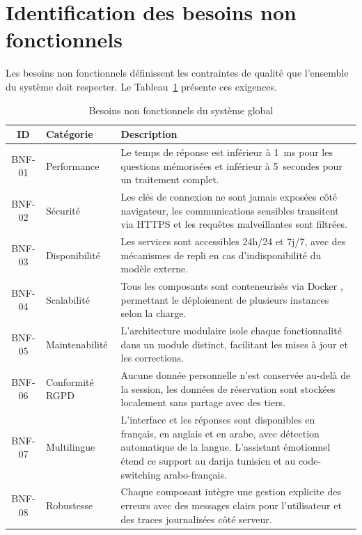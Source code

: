 \section{Identification des besoins non fonctionnels}

Les besoins non fonctionnels définissent les contraintes de qualité que l'ensemble du
système doit respecter. Le Tableau~\ref{tab:besoins_non_fonctionnels} présente ces exigences.

\vspace{6pt}
\begin{table}[H]
\caption{Besoins non fonctionnels du système global}
\label{tab:besoins_non_fonctionnels}
\centering
\small
\setlength{\tabcolsep}{4pt}
\begin{tabular}{|c|p{3cm}|p{9.8cm}|}
\hline
\textbf{ID} & \textbf{Catégorie} & \textbf{Description} \\
\hline
BNF-01 & Performance
        & Le temps de réponse est inférieur à 1~ms pour les questions mémorisées et inférieur à 5~secondes pour un traitement complet. \\
\hline
BNF-02 & Sécurité
        & Les clés de connexion ne sont jamais exposées côté navigateur, les communications sensibles transitent via HTTPS et les requêtes malveillantes sont filtrées. \\
\hline
BNF-03 & Disponibilité
        & Les services sont accessibles 24h/24 et 7j/7, avec des mécanismes de repli en cas d'indisponibilité du modèle externe. \\
\hline
BNF-04 & Scalabilité
        & Tous les composants sont conteneurisés via Docker \cite{docker}, permettant le déploiement de plusieurs instances selon la charge. \\
\hline
BNF-05 & Maintenabilité
        & L'architecture modulaire isole chaque fonctionnalité dans un module distinct, facilitant les mises à jour et les corrections. \\
\hline
BNF-06 & Conformité RGPD
        & Aucune donnée personnelle n'est conservée au-delà de la session, les données de réservation sont stockées localement sans partage avec des tiers. \\
\hline
BNF-07 & Multilingue
        & L'interface et les réponses sont disponibles en français, en anglais et en arabe, avec détection automatique de la langue. L'assistant émotionnel étend ce support au darija tunisien et au code-switching arabo-français. \\
\hline
BNF-08 & Robustesse
        & Chaque composant intègre une gestion explicite des erreurs avec des messages clairs pour l'utilisateur et des traces journalisées côté serveur. \\
\hline
\end{tabular}
\end{table}

